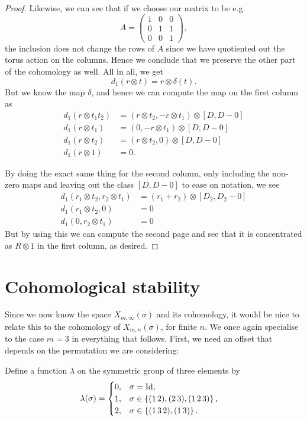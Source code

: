 \begin{proof}
  Likewise, we can see that if we choose our matrix to be e.g.
  \[ A = \begin{pmatrix}
    1 & 0 & 0 \\
    0 & 1 & 1 \\
    0 & 0 & 1
  \end{pmatrix}, \]
  the inclusion does not change the rows of $A$ since we have
  quotiented out the torus action on the columns. Hence we conclude
  that we preserve the other part of the cohomology as well. All in
  all, we get
  \[ d_1(r\otimes t) = r \otimes \delta(t). \]
  But we know the map $\delta$, and hence we can compute the map on
  the first
  column as
  \begin{align*}
    d_1(r \otimes t_1t_2) &= ( r\otimes t_2, - r\otimes t_1) \otimes
    [D,D-0] \\
    d_1(r \otimes t_1) &= (0, -r\otimes t_1) \otimes [D,D-0] \\
    d_1(r \otimes t_2) &= (r\otimes t_2,0) \otimes [D,D-0] \\
    d_1(r \otimes 1) &= 0.
  \end{align*}

  By doing the exact same thing for the second column, only including
  the non-zero maps and leaving out
  the class $[D,D-0]$ to ease on notation, we see
  \begin{align*}
    d_1( r_1\otimes t_2, r_2\otimes t_1) &= (r_1 + r_2) \otimes
                                           [D_2,D_2-0] \\
    d_1( r_1 \otimes t_2, 0) &= 0 \\
    d_1( 0, r_2\otimes t_1) &= 0
  \end{align*} 
  But by using this we can compute the second page and see that it is
  concentrated as $R\otimes 1$ in the first column, as desired.
\end{proof}


\section{Cohomological stability}
\label{sec:costa}
Since we now know the space $X_{m,\infty}(\sigma)$ and its cohomology, it
would be nice to relate this to the cohomology of
$X_{m,n}(\sigma)$, for finite $n$. We once again specialise to the
case $m = 3$ in
everything that
follows. First, we need an offset that depends on the permutation
we are considering:
\begin{definition}
  Define a function $\lambda$ on the symmetric group of three elements
  by
  \begin{align*}
    \lambda(\sigma) &=
                      \begin{cases}
                        0, & \sigma = \operatorname{Id}, \\
                        1, & \sigma \in \left\{ (1\,2),(2\,3),(1\,2\,3) \right\},
                        \\
                        2, & \sigma \in \left\{ (1\,3\,2), (1\,3) \right\}.
                      \end{cases}
  \end{align*}
\end{definition}

